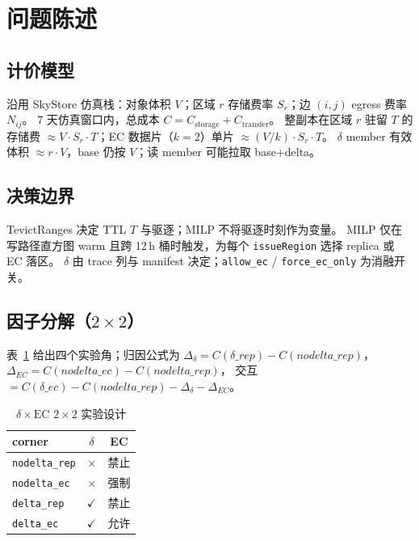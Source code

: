 \documentclass[conference]{IEEEtran}
\begin{document}
\section{问题陈述}
\label{sec:problem}

\subsection{计价模型}

沿用 SkyStore 仿真栈：对象体积 $V$；区域 $r$ 存储费率 $S_r$；边 $(i,j)$ egress 费率 $N_{ij}$。
7 天仿真窗口内，总成本 $C = C_{\mathrm{storage}} + C_{\mathrm{transfer}}$。
整副本在区域 $r$ 驻留 $T$ 的存储费 $\approx V\cdot S_r\cdot T$；EC 数据片（$k{=}2$）单片 $\approx (V/k)\cdot S_r\cdot T$。
$\delta$ member 有效体积 $\approx r\cdot V$，base 仍按 $V$；读 member 可能拉取 base+delta。

\subsection{决策边界}

TevictRanges 决定 TTL $T$ 与驱逐；MILP 不将驱逐时刻作为变量。
MILP 仅在写路径直方图 warm 且跨 12\,h 桶时触发，为每个 \texttt{issueRegion} 选择 replica 或 EC 落区。
$\delta$ 由 trace 列与 manifest 决定；\texttt{allow\_ec} / \texttt{force\_ec\_only} 为消融开关。

\subsection{因子分解（$2{\times}2$）}

表~\ref{tab:22design} 给出四个实验角；归因公式为
$\Delta_\delta = C(\delta\_rep)-C(nodelta\_rep)$，
$\Delta_{EC}=C(nodelta\_ec)-C(nodelta\_rep)$，
交互 $= C(\delta\_ec)-C(nodelta\_rep)-\Delta_\delta-\Delta_{EC}$。

\begin{table}[t]
\centering
\caption{$\delta{\times}\mathrm{EC}$ $2{\times}2$ 实验设计}
\label{tab:22design}
\begin{tabular}{lcc}
\toprule
corner & $\delta$ & EC \\
\midrule
\texttt{nodelta\_rep} & $\times$ & 禁止 \\
\texttt{nodelta\_ec}  & $\times$ & 强制 \\
\texttt{delta\_rep}   & $\checkmark$ & 禁止 \\
\texttt{delta\_ec}    & $\checkmark$ & 允许 \\
\bottomrule
\end{tabular}
\end{table}
\end{document}
